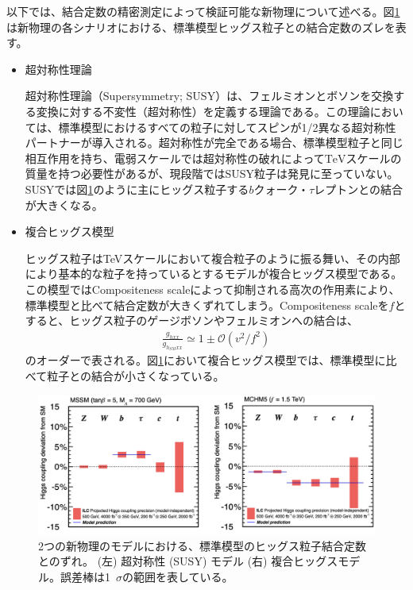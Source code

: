 以下では、結合定数の精密測定によって検証可能な新物理について述べる。図\ref{bsmdecay}は新物理の各シナリオにおける、標準模型ヒッグス粒子との結合定数のズレを表す。
\begin{itemize}
\item{超対称性理論}

超対称性理論（Supersymmetry; SUSY）は、フェルミオンとボソンを交換する変換に対する不変性（超対称性）を定義する理論である。この理論においては、標準模型におけるすべての粒子に対してスピンが1/2異なる超対称性パートナーが導入される。超対称性が完全である場合、標準模型粒子と同じ相互作用を持ち、電弱スケールでは超対称性の破れによって$\mathrm{TeV}$スケールの質量を持つ必要性があるが、現段階ではSUSY粒子は発見に至っていない。SUSYでは図\ref{bsmdecay}のように主にヒッグス粒子する$b$クォーク・$\tau$レプトンとの結合が大きくなる。
\item{複合ヒッグス模型}

ヒッグス粒子はTeVスケールにおいて複合粒子のように振る舞い、その内部により基本的な粒子を持っているとするモデルが複合ヒッグス模型である。この模型ではCompositeness scaleによって抑制される高次の作用素により、標準模型と比べて結合定数が大きくずれてしまう。Compositeness scaleを$f$とすると、ヒッグス粒子のゲージボソンやフェルミオンへの結合は、
\begin{align}
\frac{g_{hxx}}{g_{h_{SM}xx}} \simeq 1 \pm \mathcal{O}(v^2 / f^2)
\end{align}
のオーダーで表される。図\ref{bsmdecay}において複合ヒッグス模型では、標準模型に比べて粒子との結合が小さくなっている。
\end{itemize}
\begin{figure}[H]
	\begin{center}
 \includegraphics[keepaspectratio, scale=0.25]
 	{Figure/Introduction/bsmdecay.png}
 		\caption{2つの新物理のモデルにおける、標準模型のヒッグス粒子結合定数とのずれ。 (左) 超対称性 (SUSY) モデル (右) 複合ヒッグスモデル。誤差棒は1\, $\sigma$の範囲を表している。}
 		\label{bsmdecay}
	\end{center}
\end{figure}
